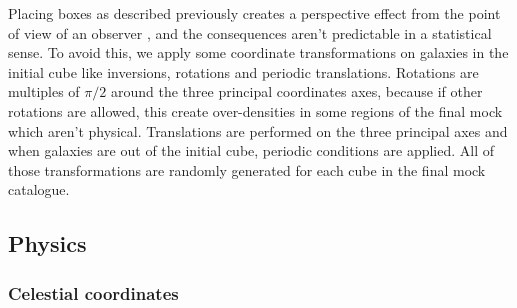 Placing boxes as described previously creates a perspective effect from the
point of view of an observer \citep{Blaizot+05}, and the consequences aren't
predictable in a statistical sense. To avoid this, we apply some coordinate
transformations on galaxies in the initial cube like inversions, rotations and
periodic translations. Rotations are multiples of $\pi/2$ around the three
principal coordinates axes, because if other rotations are allowed, this create
over-densities in some regions of the final mock which aren't physical.
Translations are performed on the three principal axes and when galaxies are
out of the initial cube, periodic conditions are applied. All of those
transformations are randomly generated for each cube in the final mock
catalogue.

\subsection{Physics}

\subsubsection{Celestial coordinates}

